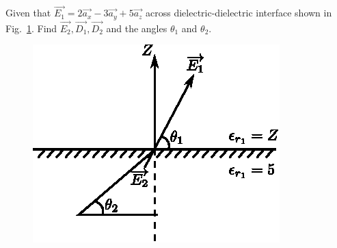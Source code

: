 \begin{problem}
Given that $\overrightarrow{E_{1}} = 2\overrightarrow{a_{x}} - 3\overrightarrow{a_{y}} + 5\overrightarrow{a_{z}}$ across dielectric-dielectric interface shown in Fig.~\ref{chap27-fig3}. Find $\overrightarrow{E_{2}}, \overrightarrow{D_{1}}, \overrightarrow{D_{2}}$ and the angles $\theta_{1}$ and $\theta_{2}$. 
\begin{figure}[H]
\centering
\includegraphics[scale=1.1]{images/fig3.eps}\label{chap27-fig3}
\end{figure}
\end{problem}


